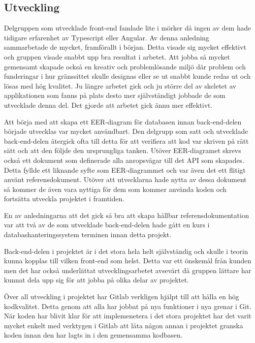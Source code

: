 \subsection{Utveckling}
Delgruppen som utvecklade front-end famlade lite i mörker då ingen av dem hade tidigare erfarenhet av Typescript eller Angular. Av denna anledning sammarbetade de mycket, framförallt i början. Detta visade sig mycket effektivt och gruppen visade snabbt upp bra resultat i arbetet. Att jobba så mycket gemensamt skapade också en kreativ och problemlösande miljö där problem och funderingar i hur gränssittet skulle designas eller se ut snabbt kunde redas ut och lösas med hög kvalitet. Ju längre arbetet gick och ju större del av skeletet av applikationen som fanns på plats desto mer självständigt jobbade de som utvecklade denna del. Det gjorde att arbetet gick ännu mer effektivt.

Att börja med att skapa ett EER-diagram för databasen innan back-end-delen började utvecklas var mycket användbart. Den delgrupp som satt och utvecklade back-end-delen återgick ofta till detta för att verifiera att kod var skriven på rätt sätt och att den följde den ursprungliga tanken. Utöver EER-diagramet skrevs också ett dokument som definerade alla anropsvägar till det API som skapades. Detta fyllde ett liknande syfte som EER-diagrammet och var även det ett flitigt använt referensdokument. Utöver att utvecklarna hade nytta av dessa dokument så kommer de även vara nyttiga för dem som kommer använda koden och fortsätta utveckla projektet i framtiden.

En av anledningarna att det gick så bra att skapa hållbar referensdokumentation var att två av de som utvecklade back-end-delen hade gått en kurs i databashanteringssystem terminen innan detta projekt.

Back-end-delen i projektet är i det stora hela helt självständig och skulle i teorin kunna kopplas till vilken front-end som helst. Detta var ett önskemål från kunden men det har också underlättat utvecklingsarbetet avsevärt då gruppen lättare har kunnat dela upp sig för att jobba på olika delar av projektet.

Över all utveckling i projektet har Gitlab verkligen hjälpt till att hålla en hög kodkvalitet. Detta genom att alla har jobbat på nya funktioner i nya grenar i Git. När koden har blivit klar för att implemenetera i det stora projektet har det varit mycket enkelt med verktygen i Gitlab att låta någon annan i projektet granska koden innan den har lagts in i den gemensamma kodbasen.

